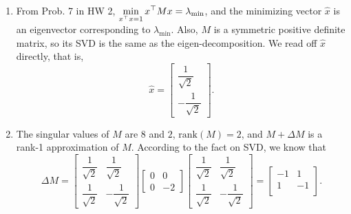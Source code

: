 \documentclass[letterpaper]{article}
\begin{document}
\begin{enumerate}
    \setlength{\itemsep}{.15in}
    \renewcommand{\labelenumi}{(\alph{enumi})}
    \setlength{\itemsep}{.1in}
  \item From Prob. 7 in HW 2, ${\displaystyle \min_{x^\top x =1}x^\top M x }=\lambda_{\min}$, and the minimizing vector $\widehat{x}$ is an eigenvector corresponding to $\lambda_{\min}$. Also, $M$ is a symmetric positive definite matrix, so its SVD is the same as the eigen-decomposition. We read off $\widehat{x}$ directly, that is,
        \begin{equation}
          \widehat{x} =\left[  \begin{array}{cc} \dfrac{1}{\sqrt{2}}\\[5mm] -\dfrac{1}{\sqrt{2}}\end{array} \right].
        \end{equation}

  \item The singular values of $M$ are $8$ and $2$, $\mathrm{rank}(M)=2$, and $M+\Delta M$ is a rank-1 approximation of $M$. According to the fact on SVD, we know that
        \begin{equation}
          \Delta M = \left[  \begin{array}{cc} \dfrac{1}{\sqrt{2}} & \dfrac{1}{\sqrt{2}}\\[5mm] \dfrac{1}{\sqrt{2}} & -\dfrac{1}{\sqrt{2}}\end{array} \right]
          \left[  \begin{array}{rr} 0 & 0 \\[2mm] 0 & -2\end{array} \right]
          \left[  \begin{array}{cc} \dfrac{1}{\sqrt{2}} & \dfrac{1}{\sqrt{2}}\\[5mm] \dfrac{1}{\sqrt{2}} & -\dfrac{1}{\sqrt{2}}\end{array} \right]
          =\left[\begin{array}{rr} -1 & 1 \\1 & -1 \\ \end{array}\right].
        \end{equation}


\end{enumerate}
\end{document}
